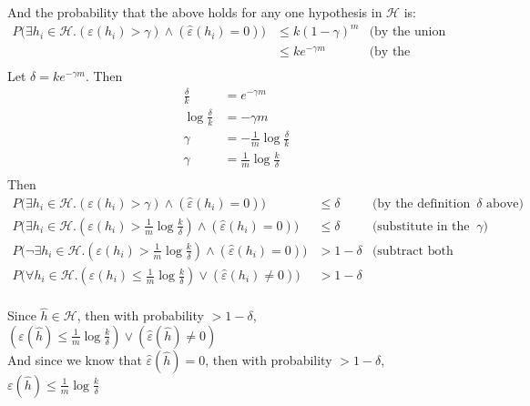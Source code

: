 \documentclass[11pt]{article}
\begin{document}
And the probability that the above holds for any one hypothesis in $\mathcal{H}$ is: \begin{align*}
    P\big(\exists h_i \in \mathcal{H} . (\varepsilon(h_i) > \gamma) \land (\hat{\varepsilon}(h_i) = 0)\big) &\le k(1 - \gamma)^m &\text{(by the union bound)} \\
                                                                                      &\le ke^{- \gamma m} &\text{(by the inequality given in the problem)} \\
\end{align*}
Let $\delta = ke^{-\gamma m}$. Then \begin{align*}
    \frac{\delta}{k} &= e^{-\gamma m} \\
    \log \frac{\delta}{k} &= -\gamma m \\
    \gamma &= - \frac{1}{m} \log \frac{\delta}{k} \\
    \gamma &= \frac{1}{m} \log \frac{k}{\delta} \\
\end{align*}
Then \begin{align*}
    P\big(\exists h_i \in \mathcal{H} . (\varepsilon(h_i) > \gamma) \land (\hat{\varepsilon}(h_i) = 0)\big) &\le \delta &\text{(by the definition of $\delta$ above)} \\
    P\big(\exists h_i \in \mathcal{H} . (\varepsilon(h_i) > \frac{1}{m} \log \frac{k}{\delta}) \land (\hat{\varepsilon}(h_i) = 0)\big) &\le \delta &\text{(substitute in the value of $\gamma$)} \\
    P\big(\neg \exists h_i \in \mathcal{H} . (\varepsilon(h_i) > \frac{1}{m} \log \frac{k}{\delta}) \land (\hat{\varepsilon}(h_i) = 0)\big) &> 1 - \delta &\text{(subtract both sides from 1)} \\
    P\big(\forall h_i \in \mathcal{H} . (\varepsilon(h_i) \le \frac{1}{m} \log \frac{k}{\delta}) \lor (\hat{\varepsilon}(h_i) \ne 0)\big) &> 1 - \delta & \\
\end{align*}

Since $\hat{h} \in \mathcal{H}$, then with probability $> 1 - \delta$,\\
$(\varepsilon(\hat{h}) \le \frac{1}{m} \log \frac{k}{\delta}) \lor (\hat{\varepsilon}(\hat{h}) \ne 0)$ \\

And since we know that $\hat{\varepsilon}(\hat{h}) = 0$, then with probability $> 1 - \delta$,\\
$\varepsilon(\hat{h}) \le \frac{1}{m} \log \frac{k}{\delta}$ \\
\end{document}
